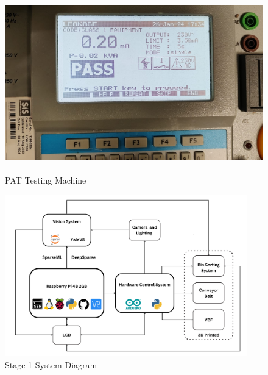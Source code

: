 \begin{figure}[t]
  \begin{minipage}[t]{0.49\textwidth}
      \centering
      \includegraphics[width=\textwidth,height=7cm, keepaspectratio]{imgs/pattesting.jpeg}
      \caption{PAT Testing Machine}
      \label{fig:pat}
    \end{minipage}
    \hfill
    \begin{minipage}[t]{0.49\textwidth}
      \centering
      \includegraphics[width=\textwidth,height=7cm, keepaspectratio]{imgs/diagrams/systemdiagram.png}
      \caption{Stage 1 System Diagram}
      \label{fig:sysdiagram}
    \end{minipage}
    \hfill
\end{figure}